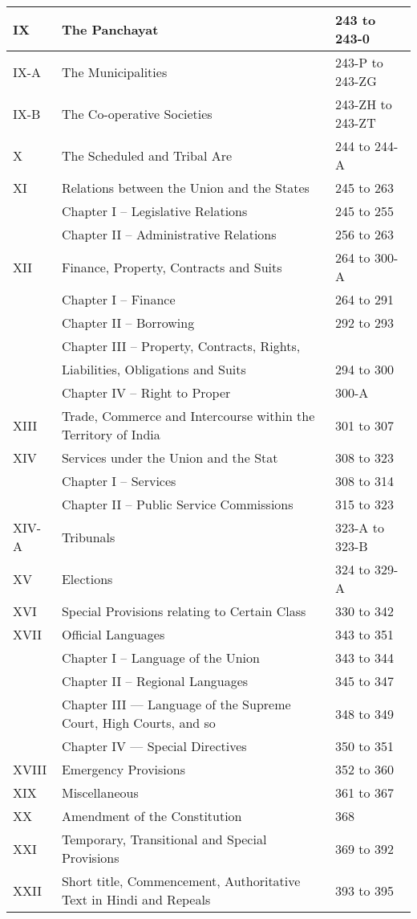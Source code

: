 \begin{longtable}[c]{@{}|p{1cm}|p{7cm}|p{4cm}|@{}}
  IX & The Panchayat & 243 to 243-0 \\\midrule
  IX-A & The Municipalities & 243-P to 243-ZG \\\midrule
  IX-B & The Co-operative Societies & 243-ZH to 243-ZT \\\midrule
  X & The Scheduled and Tribal Are & 244 to 244-A \\\midrule
  XI & Relations between the Union and the States & 245 to 263 \\
  & Chapter I – Legislative Relations & 245 to 255 \\
  & Chapter II – Administrative Relations & 256 to 263 \\\midrule
  XII & Finance, Property, Contracts and Suits & 264 to 300-A \\*\midrule
  & Chapter I – Finance & 264 to 291 \\
  & Chapter II – Borrowing & 292 to 293 \\
  & Chapter III – Property, Contracts, Rights, &  \\
  & Liabilities, Obligations and Suits & 294 to 300 \\
  & Chapter IV – Right to Proper & 300-A \\ \midrule
  XIII & Trade, Commerce and Intercourse within the Territory of India & 301 to 307 \\\midrule
  XIV & Services under the Union and the Stat & 308 to 323 \\
  & Chapter I – Services & 308 to 314 \\
  & Chapter II – Public Service Commissions & 315 to 323 \\\midrule
  XIV-A & Tribunals & 323-A to 323-B \\\midrule
  XV & Elections & 324 to 329-A \\\midrule
  XVI & Special Provisions relating to Certain Class & 330 to 342 \\\midrule
  XVII & Official Languages & 343 to 351 \\
  & Chapter I – Language of the Union & 343 to 344 \\
  & Chapter II – Regional Languages & 345 to 347 \\
  & Chapter III — Language of the Supreme Court, High Courts, and so & 348 to 349 \\
  & Chapter IV — Special Directives & 350 to 351 \\\midrule
  XVIII & Emergency Provisions & 352 to 360 \\\midrule
  XIX & Miscellaneous & 361 to 367 \\\midrule
  XX & Amendment of the Constitution & 368 \\\midrule
  XXI & Temporary, Transitional and Special Provisions & 369 to 392 \\\midrule
  XXII & Short title, Commencement, Authoritative Text in Hindi and Repeals & 393 to 395\\\bottomrule
\end{longtable}

